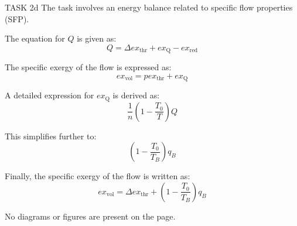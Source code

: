 TASK 2d  
The task involves an energy balance related to specific flow properties (SFP).  

The equation for \( Q \) is given as:  
\[
Q = \Delta ex_{\text{thr}} + ex_{\text{Q}} - ex_{\text{red}}
\]  

The specific exergy of the flow is expressed as:  
\[
ex_{\text{vol}} = p ex_{\text{thr}} + ex_{\text{Q}}
\]  

A detailed expression for \( ex_{\text{Q}} \) is derived as:  
\[
\frac{1}{n} \left( 1 - \frac{T_0}{T} \right) Q
\]  

This simplifies further to:  
\[
\left( 1 - \frac{T_0}{T_B} \right) q_B
\]  

Finally, the specific exergy of the flow is written as:  
\[
ex_{\text{vol}} = \Delta ex_{\text{thr}} + \left( 1 - \frac{T_0}{T_B} \right) q_B
\]  

No diagrams or figures are present on the page.